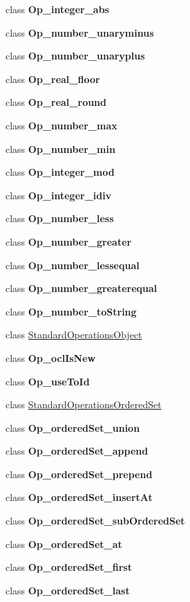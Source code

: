 \begin{DoxyCompactItemize}
class {\bfseries Op\-\_\-integer\-\_\-abs}
\item 
class {\bfseries Op\-\_\-number\-\_\-unaryminus}
\item 
class {\bfseries Op\-\_\-number\-\_\-unaryplus}
\item 
class {\bfseries Op\-\_\-real\-\_\-floor}
\item 
class {\bfseries Op\-\_\-real\-\_\-round}
\item 
class {\bfseries Op\-\_\-number\-\_\-max}
\item 
class {\bfseries Op\-\_\-number\-\_\-min}
\item 
class {\bfseries Op\-\_\-integer\-\_\-mod}
\item 
class {\bfseries Op\-\_\-integer\-\_\-idiv}
\item 
class {\bfseries Op\-\_\-number\-\_\-less}
\item 
class {\bfseries Op\-\_\-number\-\_\-greater}
\item 
class {\bfseries Op\-\_\-number\-\_\-lessequal}
\item 
class {\bfseries Op\-\_\-number\-\_\-greaterequal}
\item 
class {\bfseries Op\-\_\-number\-\_\-to\-String}
\item 
class \hyperlink{classorg_1_1tzi_1_1use_1_1uml_1_1ocl_1_1expr_1_1operations_1_1_standard_operations_object}{Standard\-Operations\-Object}
\item 
class {\bfseries Op\-\_\-ocl\-Is\-New}
\item 
class {\bfseries Op\-\_\-use\-To\-Id}
\item 
class \hyperlink{classorg_1_1tzi_1_1use_1_1uml_1_1ocl_1_1expr_1_1operations_1_1_standard_operations_ordered_set}{Standard\-Operations\-Ordered\-Set}
\item 
class {\bfseries Op\-\_\-ordered\-Set\-\_\-union}
\item 
class {\bfseries Op\-\_\-ordered\-Set\-\_\-append}
\item 
class {\bfseries Op\-\_\-ordered\-Set\-\_\-prepend}
\item 
class {\bfseries Op\-\_\-ordered\-Set\-\_\-insert\-At}
\item 
class {\bfseries Op\-\_\-ordered\-Set\-\_\-sub\-Ordered\-Set}
\item 
class {\bfseries Op\-\_\-ordered\-Set\-\_\-at}
\item 
class {\bfseries Op\-\_\-ordered\-Set\-\_\-first}
\item 
class {\bfseries Op\-\_\-ordered\-Set\-\_\-last}
\item 

\end{DoxyCompactItemize}
